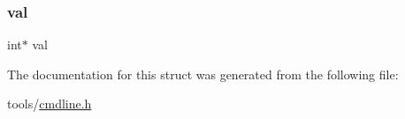 \mbox{\label{struct__opts_a482251298d068445d0ecb6f0c6ed54a7}} 
\subsubsection{\texorpdfstring{val}{val}}
{\footnotesize\ttfamily int$\ast$ val}



The documentation for this struct was generated from the following file\+:\begin{DoxyCompactItemize}
\item 
tools/\hyperlink{cmdline_8h}{cmdline.\+h}\end{DoxyCompactItemize}
